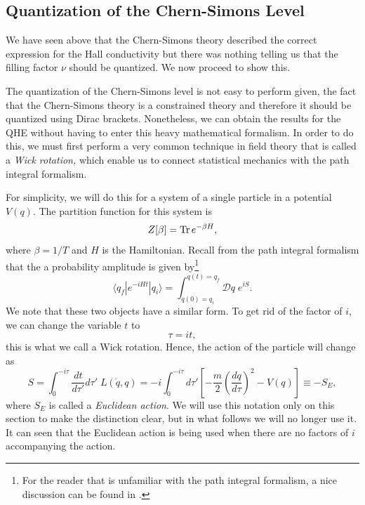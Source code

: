 \documentclass{article}
\begin{document}
\subsection{Quantization of the Chern-Simons Level}
We have seen above that the Chern-Simons theory described the correct expression for the Hall conductivity but there was nothing telling us that the filling factor $\nu$ should be quantized. We now proceed to show this. 

The quantization of the Chern-Simons level is not easy to perform given, the fact that the Chern-Simons theory is a constrained theory and therefore it should be quantized using Dirac brackets\cite{Dirac_1950}. Nonetheless, we can obtain the results for the QHE without having to enter this heavy mathematical formalism. In order to do this, we must first perform a very common technique in field theory that is called a \textit{Wick rotation,} which enable us to connect statistical mechanics with the path integral formalism. 

For simplicity, we will do this for a system of a single particle in a potential $V(q)$. The partition function for this system is 
\begin{equation}
	Z[\beta]=\Tr e^{-\beta H},
\end{equation}
where $\beta=1/T$ and $H$ is the Hamiltonian. Recall from the path integral formalism that the a probability amplitude is given by\footnote{For the reader that is unfamiliar with the path integral formalism, a nice discussion can be found in \cite{nakahara_geometry_2003}.} 
\begin{equation}
	\langle q_f|e^{-iHt}|q_i \rangle=\int_{q(0)=q_i}^{q(t)=q_f} \mathcal{D}q\;e^{iS}.
\end{equation}
We note that these two objects have a similar form. To get rid of the factor of $i$, we can change the variable $t$ to 
\begin{equation}
	\tau = it,
\end{equation}
this is what we call a Wick rotation. Hence, the action of the particle will change as
\begin{equation}
	S=\int_0^{-i\tau} \frac{dt}{d\tau'}d\tau' \;L(\dot{q},q)=-i\int_0^{-i\tau}d\tau'\left[-\frac{m}{2}\left(\frac{dq}{d\tau}\right)^2-V(q)\right]\equiv -S_E,
\end{equation}
where $S_E$ is called a \textit{Euclidean action}. We will use this notation only on this section to make the distinction clear, but in what follows we will no longer use it. It can seen that the Euclidean action is being used when there are no factors of $i$ accompanying the action. 
\end{document}
